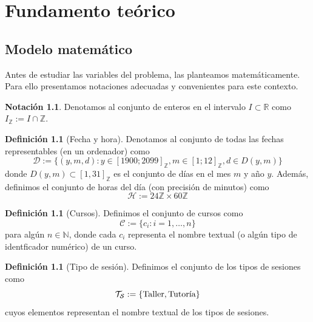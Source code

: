 \documentclass[11pt,a4paper]{book}
\theoremstyle{definition}%
\newtheorem{definicion}[teorema]{Definici\'on}
\newtheorem{notacion}[teorema]{Notaci\'on}
\newcommand{\Real}{\mathbb{R}}
\newcommand{\Integer}{\mathbb{Z}}
\begin{document}
        \chapter{Fundamento teórico}
            \section{Modelo matemático}
            Antes de estudiar las variables del problema, las planteamos matemáticamente. Para ello presentamos notaciones adecuadas y convenientes para este contexto.

            \begin{notacion}
                Denotamos al conjunto de enteros en el intervalo $I\subset\Real$ como $I_\mathbb{Z}:=I\cap\mathbb{Z}$.
            \end{notacion}
            
            \begin{definicion}[Fecha y hora]
                Denotamos al conjunto de todas las fechas representables (en un ordenador) como
                \begin{equation*}
                    \mathcal{D}:=\{(y,m,d):y\in [1900;2099]_\Integer, m\in[1;12]_\Integer, d\in D(y,m)\}
                \end{equation*}
                donde $D(y,m)\subset[1,31]_\Integer$ es el conjunto de días en el mes $m$ y año $y$. Además, definimos el conjunto de horas del día (con precisión de minutos) como
                \begin{equation*}
                    \mathcal{H}:=24\Integer\times 60\Integer
                \end{equation*}
            \end{definicion}
            
            \begin{definicion}[Cursos]
                Definimos el conjunto de cursos como
                \begin{equation*}
                    \mathcal{C}:=\{c_i: i=1,\ldots,n\}
                \end{equation*}
                para algún $n\in\mathbb{N}$, donde cada $c_i$ representa el nombre textual (o algún tipo de identficador numérico) de un curso.
            \end{definicion}

            \begin{definicion}[Tipo de sesión]
                Definimos el conjunto de los tipos de sesiones como
                \begin{equation*}
                    \mathcal{T}_\mathcal{S}:=\{\textup{Taller},\textup{Tutoría}\}
                \end{equation*}
                cuyos elementos representan el nombre textual de los tipos de sesiones.
            \end{definicion}
\end{document}
